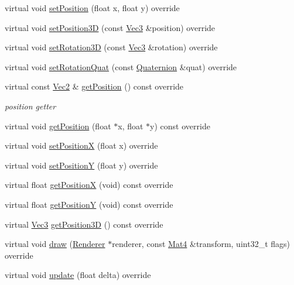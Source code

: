 \begin{DoxyCompactItemize}
virtual void \hyperlink{classMotionStreak3D_af19878b923b0caae1704f93a9ee21699}{set\+Position} (float x, float y) override
\item 
virtual void \hyperlink{classMotionStreak3D_a34fac2c60502d074f8e40e99d01d9180}{set\+Position3D} (const \hyperlink{classVec3}{Vec3} \&position) override
\item 
virtual void \hyperlink{classMotionStreak3D_a6ef719a2412711e81c3bfc40ce53c3e2}{set\+Rotation3D} (const \hyperlink{classVec3}{Vec3} \&rotation) override
\item 
virtual void \hyperlink{classMotionStreak3D_a7e9e94bce7204f28d6b8dff196d163d9}{set\+Rotation\+Quat} (const \hyperlink{classQuaternion}{Quaternion} \&quat) override
\item 
virtual const \hyperlink{classVec2}{Vec2} \& \hyperlink{classMotionStreak3D_a17b236b952ac5670676b2b50a0fab421}{get\+Position} () const override
\begin{DoxyCompactList}\small\item\em position getter \end{DoxyCompactList}\item 
virtual void \hyperlink{classMotionStreak3D_aca30ce7817540e8cf038cf11adc58154}{get\+Position} (float $\ast$x, float $\ast$y) const override
\item 
virtual void \hyperlink{classMotionStreak3D_a1b723a27b44aa12ced168fe18ca920de}{set\+PositionX} (float x) override
\item 
virtual void \hyperlink{classMotionStreak3D_a8f63bcfa700cf9d67907d9e6f31bace6}{set\+PositionY} (float y) override
\item 
virtual float \hyperlink{classMotionStreak3D_a1cbae92f092d3fb20371a676de053d07}{get\+PositionX} (void) const override
\item 
virtual float \hyperlink{classMotionStreak3D_a9880e5a12cec812ba36804232e73bd7b}{get\+PositionY} (void) const override
\item 
virtual \hyperlink{classVec3}{Vec3} \hyperlink{classMotionStreak3D_ab2c89d13a16dc7ee2e8f2408a1f5afbb}{get\+Position3D} () const override
\item 
virtual void \hyperlink{classMotionStreak3D_a3b13ccd501ac16227a117870695f34f1}{draw} (\hyperlink{classRenderer}{Renderer} $\ast$renderer, const \hyperlink{classMat4}{Mat4} \&transform, uint32\+\_\+t flags) override
\item 
virtual void \hyperlink{classMotionStreak3D_a3d336bcb41bd598ba73389378b278382}{update} (float delta) override
\item 

\end{DoxyCompactItemize}
